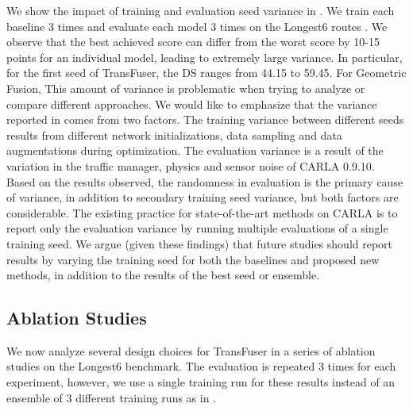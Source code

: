  We show the impact of training and evaluation seed variance in . We train each baseline 3 times and evaluate each model 3 times on the Longest6 routes . We observe that the best achieved score can differ from the worst score by 10-15 points for an individual model, leading to extremely large variance. In particular, for the first seed of TransFuser, the DS ranges from 44.15 to 59.45. For Geometric Fusion,  This amount of variance is problematic when trying to analyze or compare different approaches. We would like to emphasize that the variance reported in  comes from two factors. The training variance between different seeds results from different network initializations, data sampling and data augmentations during optimization. The evaluation variance is a result of the variation in the traffic manager, physics and sensor noise of CARLA 0.9.10. Based on the results observed, the randomness in evaluation is the primary cause of variance, in addition to secondary training seed variance, but both factors are considerable. The existing practice for state-of-the-art methods on CARLA is to report only the evaluation variance by running multiple evaluations of a single training seed.  We argue (given these findings) that future studies should report results by varying the training seed for both the baselines and proposed new methods, in addition to the results of the best seed or ensemble.

\subsection{Ablation Studies}
\label{sec:ablation}

We now analyze several design choices for TransFuser in a series of ablation studies on the Longest6 benchmark.  The evaluation is repeated 3 times for each experiment, however, we use a single training run for these results instead of an ensemble of 3 different training runs as in .  

